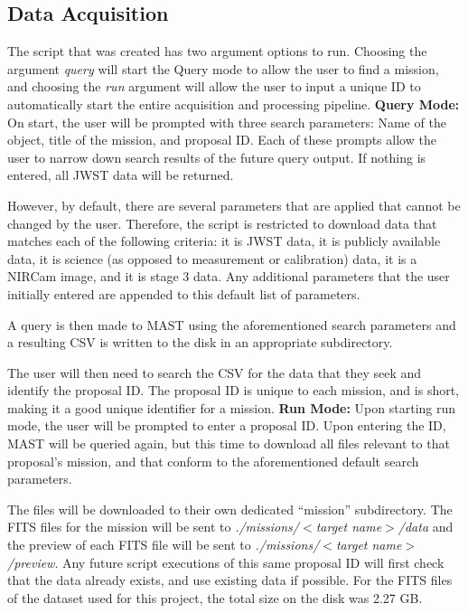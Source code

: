 \documentclass[10pt,twocolumn,letterpaper]{article}
\begin{document}
\subsection{Data Acquisition}

The script that was created has two argument options to run. Choosing the argument \emph{query} will start the Query mode to allow the user to find a mission, and choosing the \emph{run} argument will allow the user to input a unique ID to automatically start the entire acquisition and processing pipeline.
\newline
\textbf{Query Mode:} On start, the user will be prompted with three search parameters: Name of the object, title of the mission, and proposal ID. Each of these prompts allow the user to narrow down search results of the future query output. If nothing is entered, all JWST data will be returned.

However, by default, there are several parameters that are applied that cannot be changed by the user. Therefore, the script is restricted to download data that matches each of the following criteria: it is JWST data, it is publicly available data, it is science (as opposed to measurement or calibration) data, it is a NIRCam image, and it is stage 3 data. Any additional parameters that the user initially entered are appended to this default list of parameters.

A query is then made to MAST using the aforementioned search parameters and a resulting CSV is written to the disk in an appropriate subdirectory.

The user will then need to search the CSV for the data that they seek and identify the proposal ID. The proposal ID is unique to each mission, and is short, making it a good unique identifier for a mission.
\newline
\textbf{Run Mode:} Upon starting run mode, the user will be prompted to enter a proposal ID. Upon entering the ID, MAST will be queried again, but this time to download all files relevant to that proposal's mission, and that conform to the aforementioned default search parameters.

The files will be downloaded to their own dedicated ``mission'' subdirectory. The FITS files for the mission will be sent to \emph{./missions/$<$target name$>$/data} and the preview of each FITS file will be sent to \emph{./missions/$<$target name$>$/preview}. Any future script executions of this same proposal ID will first check that the data already exists, and use existing data if possible. For the FITS files of the dataset used for this project, the total size on the disk was 2.27 GB.
\end{document}
